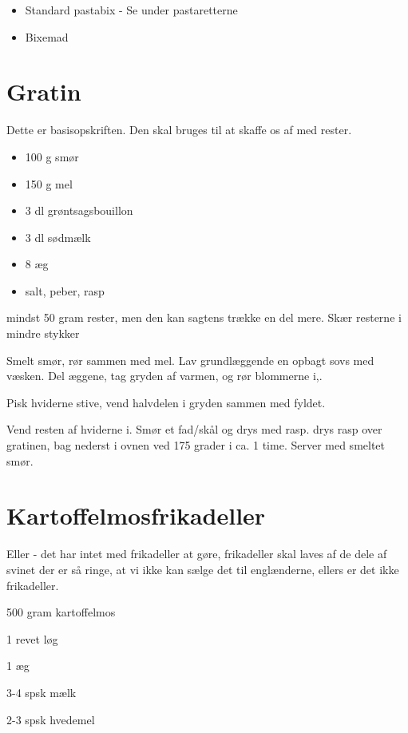 \documentclass[
  letterpaper,
  DIV=11,
  numbers=noendperiod]{scrreprt}
\providecommand{\tightlist}{%
  \setlength{\itemsep}{0pt}\setlength{\parskip}{0pt}}\usepackage{longtable,booktabs,array}
\begin{document}
\begin{itemize}
\tightlist
\item
  Standard pastabix - Se under pastaretterne
\item
  Bixemad
\end{itemize}

\hypertarget{gratin}{%
\section{Gratin}\label{gratin}}

Dette er basisopskriften. Den skal bruges til at skaffe os af med
rester.

\begin{itemize}
\tightlist
\item
  100 g smør
\item
  150 g mel
\item
  3 dl grøntsagsbouillon
\item
  3 dl sødmælk
\item
  8 æg
\item
  salt, peber, rasp
\end{itemize}

mindst 50 gram rester, men den kan sagtens trække en del mere. Skær
resterne i mindre stykker

Smelt smør, rør sammen med mel. Lav grundlæggende en opbagt sovs med
væsken. Del æggene, tag gryden af varmen, og rør blommerne i,.

Pisk hviderne stive, vend halvdelen i gryden sammen med fyldet.

Vend resten af hviderne i. Smør et fad/skål og drys med rasp. drys rasp
over gratinen, bag nederst i ovnen ved 175 grader i ca. 1 time. Server
med smeltet smør.

\hypertarget{kartoffelmosfrikadeller}{%
\section{Kartoffelmosfrikadeller}\label{kartoffelmosfrikadeller}}

Eller - det har intet med frikadeller at gøre, frikadeller skal laves af
de dele af svinet der er så ringe, at vi ikke kan sælge det til
englænderne, ellers er det ikke frikadeller.

500 gram kartoffelmos

1 revet løg

1 æg

3-4 spsk mælk

2-3 spsk hvedemel
\end{document}
